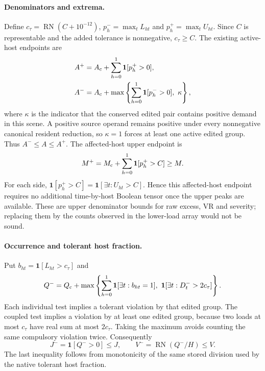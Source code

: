 \documentclass[11pt]{article}
\begin{document}
\paragraph{Denominators and extrema.}
Define $c_\tau=\operatorname{RN}(C+10^{-12})$, $p_h^-=\max_tL_{ht}$ and $p_h^+=\max_tU_{ht}$. Since $C$ is representable and the added tolerance is nonnegative, $c_\tau\ge C$. The existing active-host endpoints are
\begin{align}
A^+&=A_{\rm c}+\sum_{h=0}^1\mathbf 1[p_h^+>0],\\
A^-&=A_{\rm c}+\max\left\{\sum_{h=0}^1\mathbf 1[p_h^->0],\ \kappa\right\},
\label{eq:aggregate-active-counts}
\end{align}
where $\kappa$ is the indicator that the conserved edited pair contains positive demand in this scene. A positive source operand remains positive under every nonnegative canonical resident reduction, so $\kappa=1$ forces at least one active edited group. Thus $A^-\le A\le A^+$. The affected-host upper endpoint is
\begin{equation}
M^+=M_{\rm c}+\sum_{h=0}^1\mathbf 1[p_h^+>C]\ge M.
\label{eq:aggregate-affected-count}
\end{equation}
For each side, $\mathbf 1[p_h^+>C]=\mathbf 1[\exists t:U_{ht}>C]$. Hence this affected-host endpoint requires no additional time-by-host Boolean tensor once the upper peaks are available. These are upper denominator bounds for raw excess, VR and severity; replacing them by the counts observed in the lower-load array would not be sound.

\paragraph{Occurrence and tolerant host fraction.}
Put $b_{ht}=\mathbf 1[L_{ht}>c_\tau]$ and
\begin{equation}
Q^-=Q_{\rm c}+\max\left\{\sum_{h=0}^1\mathbf 1[\exists t:b_{ht}=1],\ \mathbf 1[\exists t:D_t^->2c_\tau]\right\}.
\label{eq:aggregate-tolerant-count}
\end{equation}
Each individual test implies a tolerant violation by that edited group. The coupled test implies a violation by at least one edited group, because two loads at most $c_\tau$ have real sum at most $2c_\tau$. Taking the maximum avoids counting the same compulsory violation twice. Consequently
\begin{equation}
J^-=\mathbf 1[Q^->0]\le J,
\qquad V^-=\operatorname{RN}(Q^-/H)\le V.
\label{eq:aggregate-j-v}
\end{equation}
The last inequality follows from monotonicity of the same stored division used by the native tolerant host fraction.
\end{document}

